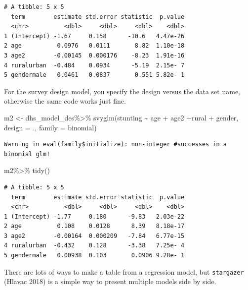\documentclass[
  letterpaper,
  DIV=11,
  numbers=noendperiod]{scrreprt}
\newenvironment{Shaded}{\begin{snugshade}}{\end{snugshade}}
\newcommand{\AttributeTok}[1]{\textcolor[rgb]{0.40,0.45,0.13}{#1}}
\newcommand{\FunctionTok}[1]{\textcolor[rgb]{0.28,0.35,0.67}{#1}}
\newcommand{\NormalTok}[1]{\textcolor[rgb]{0.00,0.23,0.31}{#1}}
\newcommand{\OtherTok}[1]{\textcolor[rgb]{0.00,0.23,0.31}{#1}}
\newcommand{\SpecialCharTok}[1]{\textcolor[rgb]{0.37,0.37,0.37}{#1}}
\begin{document}
\begin{verbatim}
# A tibble: 5 x 5
  term        estimate std.error statistic  p.value
  <chr>          <dbl>     <dbl>     <dbl>    <dbl>
1 (Intercept) -1.67     0.158      -10.6   4.47e-26
2 age          0.0976   0.0111       8.82  1.10e-18
3 age2        -0.00145  0.000176    -8.23  1.91e-16
4 ruralurban  -0.484    0.0934      -5.19  2.15e- 7
5 gendermale   0.0461   0.0837       0.551 5.82e- 1
\end{verbatim}

For the survey design model, you specify the design versus the data set
name, otherwise the same code works just fine.

\begin{Shaded}
\begin{Highlighting}[]
\NormalTok{m2 }\OtherTok{\textless{}{-}}\NormalTok{ dhs\_model\_des}\SpecialCharTok{\%\textgreater{}\%}
  \FunctionTok{svyglm}\NormalTok{(stunting }\SpecialCharTok{\textasciitilde{}}\NormalTok{ age }\SpecialCharTok{+}\NormalTok{ age2 }\SpecialCharTok{+}\NormalTok{rural }\SpecialCharTok{+}\NormalTok{ gender,}
         \AttributeTok{design =}\NormalTok{ .,}
         \AttributeTok{family =}\NormalTok{ binomial)}
\end{Highlighting}
\end{Shaded}

\begin{verbatim}
Warning in eval(family$initialize): non-integer #successes in a binomial glm!
\end{verbatim}

\begin{Shaded}
\begin{Highlighting}[]
\NormalTok{m2}\SpecialCharTok{\%\textgreater{}\%}
  \FunctionTok{tidy}\NormalTok{()}
\end{Highlighting}
\end{Shaded}

\begin{verbatim}
# A tibble: 5 x 5
  term        estimate std.error statistic  p.value
  <chr>          <dbl>     <dbl>     <dbl>    <dbl>
1 (Intercept) -1.77     0.180      -9.83   2.03e-22
2 age          0.108    0.0128      8.39   8.18e-17
3 age2        -0.00164  0.000209   -7.84   6.77e-15
4 ruralurban  -0.432    0.128      -3.38   7.25e- 4
5 gendermale   0.00938  0.103       0.0906 9.28e- 1
\end{verbatim}

There are lots of ways to make a table from a regression model, but
\texttt{stargazer} (Hlavac 2018) is a simple way to present multiple
models side by side.
\end{document}
